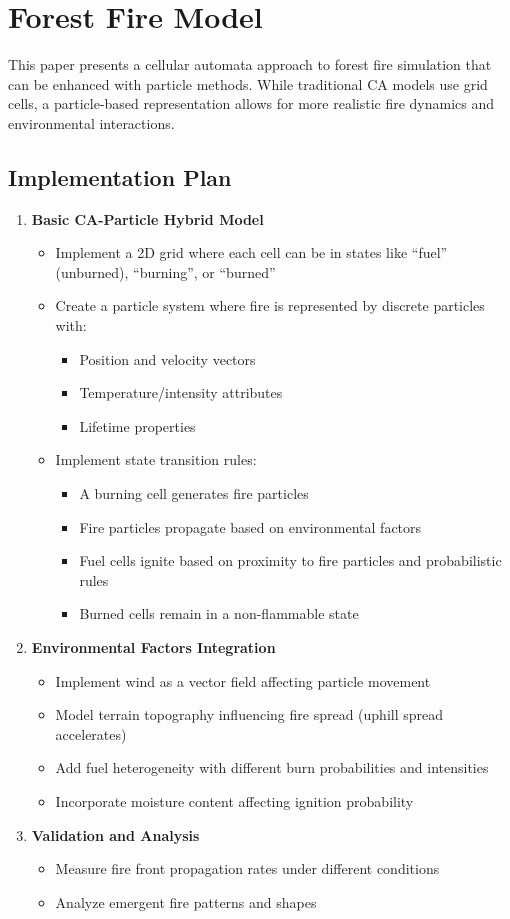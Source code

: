 \section{Forest Fire Model}
This paper \cite{inproceedings} presents a cellular automata approach to forest fire simulation that can be enhanced with particle methods. While traditional CA models use grid cells, a particle-based representation allows for more realistic fire dynamics and environmental interactions.

\subsection{Implementation Plan}
\begin{enumerate}
    \item \textbf{Basic CA-Particle Hybrid Model}
    \begin{itemize}
        \item Implement a 2D grid where each cell can be in states like ``fuel'' (unburned), ``burning'', or ``burned''
        \item Create a particle system where fire is represented by discrete particles with:
        \begin{itemize}
            \item Position and velocity vectors
            \item Temperature/intensity attributes
            \item Lifetime properties
        \end{itemize}
        \item Implement state transition rules:
        \begin{itemize}
            \item A burning cell generates fire particles
            \item Fire particles propagate based on environmental factors
            \item Fuel cells ignite based on proximity to fire particles and probabilistic rules
            \item Burned cells remain in a non-flammable state
        \end{itemize}
    \end{itemize}

    \item \textbf{Environmental Factors Integration}
    \begin{itemize}
        \item Implement wind as a vector field affecting particle movement
        \item Model terrain topography influencing fire spread (uphill spread accelerates)
        \item Add fuel heterogeneity with different burn probabilities and intensities
        \item Incorporate moisture content affecting ignition probability
    \end{itemize}

    \item \textbf{Validation and Analysis}
    \begin{itemize}
        \item Measure fire front propagation rates under different conditions
        \item Analyze emergent fire patterns and shapes
    \end{itemize}
\end{enumerate}
